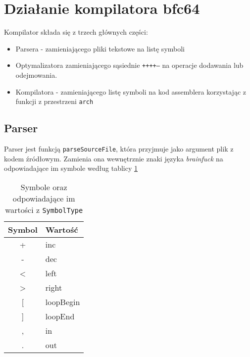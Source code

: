 \documentclass[a4paper,12pt]{article}
\begin{document}
    \section{Działanie kompilatora bfc64}

    Kompilator składa się z trzech głównych części:
    \begin{itemize}
        \item Parsera - zamieniającego pliki tekstowe na listę symboli
        \item Optymalizatora zamieniającego sąsiednie \texttt{++++--} na operacje dodawania lub odejmowania.
        \item Kompilatora - zamieniającego listę symboli na kod assemblera korzystając z funkcji z przestrzeni \texttt{arch}
    \end{itemize}

    \subsection*{Parser}

    Parser jest funkcją \texttt{parseSourceFile}, która przyjmuje jako argument plik z kodem źródłowym. Zamienia ona wewnętrznie znaki języka \emph{brainfuck} na odpowiadające im symbole według tablicy \ref{tab:symbole}

    \begin{table}[h]
        \begin{tabular}{|c|l|}
            \hline
            Symbol         & Wartość   \\ \hline
            +              & inc       \\ \hline
            -              & dec       \\ \hline
            \textless{}    & left      \\ \hline
            \textgreater{} & right     \\ \hline
            {[}            & loopBegin \\ \hline
            {]}            & loopEnd   \\ \hline
            ,              & in        \\ \hline
            .              & out       \\ \hline
        \end{tabular}
        \centering
        \caption{Symbole oraz odpowiadające im wartości z \texttt{SymbolType}}
        \label{tab:symbole}
    \end{table}
\end{document}
